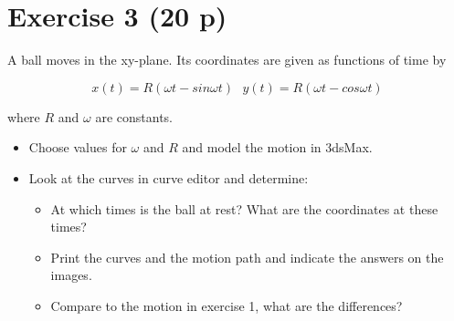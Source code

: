 \documentclass[12pt]{article}
\begin{document}
\section*{Exercise 3 (20 p)}
A ball moves in the xy-plane. Its coordinates are given as functions of time by

\begin{equation}
    x(t)=R(\omega t-sin \omega t) \ \ \  y(t)=R(\omega t-cos \omega t)
\end{equation}

where $R$ and $\omega$ are constants.

\begin{itemize}
    \item Choose values for $\omega$ and $R$ and model the motion in 3dsMax.
    \item Look at the curves in curve editor and determine:
    \begin{itemize}
        \item     At which times is
        the ball at rest? What are the coordinates at these times?
        \item Print the curves and the motion path and indicate the answers on the images.
        \item  Compare to the motion in exercise 1, what are the differences?
    \end{itemize}

\end{itemize}
\end{document}
